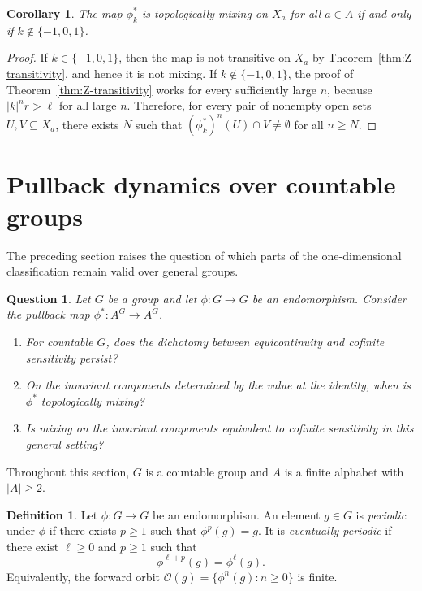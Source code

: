 \documentclass[12pt,a4paper]{article}
\newtheorem{corollary}[theorem]{Corollary}
\newtheorem{question}[theorem]{Question}
\theoremstyle{definition}
\newtheorem{definition}[theorem]{Definition}
\theoremstyle{remark}
\newcommand{\Orb}{\mathcal{O}}
\begin{document}
\begin{corollary}\label{cor:Z-mixing}
The map $\phi_k^*$ is topologically mixing on $X_a$ for all $a \in A$ if and only if $k\notin\{-1,0,1\}$.
\end{corollary}

\begin{proof}
If $k\in\{-1,0,1\}$, then the map is not transitive on $X_a$ by Theorem~\ref{thm:Z-transitivity}, and hence it is not mixing. If $k\notin\{-1,0,1\}$, the proof of Theorem~\ref{thm:Z-transitivity} works for every sufficiently large $n$, because $|k|^n r>\ell$ for all large $n$. Therefore, for every pair of nonempty open sets $U,V\subseteq X_a$, there exists $N$ such that $(\phi_k^*)^n(U)\cap V\neq\emptyset$ for all $n\geq N$.
\end{proof}

\section{Pullback dynamics over countable groups}\label{sec:countable-groups}

The preceding section raises the question of which parts of the one-dimensional classification remain valid over general groups.

\begin{question}
Let $G$ be a group and let $\phi:G\to G$ be an endomorphism. Consider the pullback map $\phi^*:A^G\to A^G$.
\begin{enumerate}
\item For countable $G$, does the dichotomy between equicontinuity and cofinite sensitivity persist?
\item On the invariant components determined by the value at the identity, when is $\phi^*$ topologically mixing?
\item Is mixing on the invariant components equivalent to cofinite sensitivity in this general setting?
\end{enumerate}
\end{question}

Throughout this section, $G$ is a countable group and $A$ is a finite alphabet with $|A|\geq 2$.

\begin{definition}\label{def:eventually-periodic}
Let $\phi:G\to G$ be an endomorphism. An element $g\in G$ is \emph{periodic} under $\phi$ if there exists $p\geq 1$ such that $\phi^p(g)=g$. It is \emph{eventually periodic} if there exist $\ell\geq 0$ and $p\geq 1$ such that
\[
\phi^{\ell+p}(g)=\phi^\ell(g).
\]
Equivalently, the forward orbit $\Orb(g)=\{\phi^n(g):n\geq 0\}$ is finite.
\end{definition}
\end{document}
